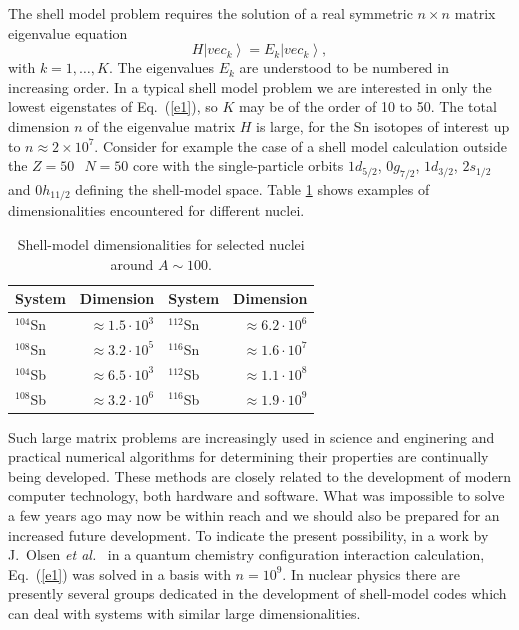 \documentclass{article}
\newcommand{\be}{\begin{equation}}
\newcommand{\ee}{\end{equation}}
\newcommand{\ket}[1]{\left| #1 \right\rangle}
\begin{document}
The shell model problem requires the solution of a real symmetric
$n \times n$ matrix eigenvalue equation
\be
H\ket{vec_k} = E_k \ket{vec_k},
\label{e1}
\ee
with $k = 1,\ldots, K$. The eigenvalues $E_k$ are understood to be
numbered in increasing order. In a typical shell model problem
we are interested in only the lowest eigenstates of Eq.~(\ref{e1}),
so $K$ may be of the order of 10 to 50.
The total dimension $n$ of the eigenvalue matrix $H$ is large,
for the Sn isotopes of interest up to $n \approx 2 \times 10^{7}$.
Consider for example the case of a shell model calculation
outside the $Z = 50\;\,\; N = 50$ core with the single-particle orbits
$1d_{5/2}$, $0g_{7/2}$, $1d_{3/2}$, $2s_{1/2}$ and $0h_{11/2}$ defining the shell-model
space. Table \ref{tab:dims} shows examples of dimensionalities encountered for 
different nuclei.
\begin{table}
\caption{Shell-model dimensionalities for selected nuclei around $A\sim 100$.\label{tab:dims}}
\begin{center}
\begin{tabular}{|lrlr|} \hline
System & Dimension & System & Dimension\\ \hline
$^{104}$Sn  & $\approx 1.5 \cdot 10^3$&  $^{112}$Sn  & $\approx 6.2 \cdot 10^6$\\
$^{108}$Sn  & $\approx 3.2 \cdot 10^5$&  $^{116}$Sn  & $\approx 1.6 \cdot 10^7$\\ 
$^{104}$Sb  & $\approx 6.5 \cdot 10^3$ &  $^{112}$Sb  & $\approx 1.1 \cdot10^8$ \\
$^{108}$Sb  & $\approx 3.2 \cdot 10^6$ &  $^{116}$Sb  & $\approx 1.9 \cdot 10^9$ \\ \hline
\end{tabular}
\end{center}
\end{table}
Such large matrix problems are increasingly used in science and
enginering and practical numerical algorithms for determining their
properties are continually being developed.
These methods are closely related to the development of modern
computer technology, both  hardware and software.
What was impossible to solve a few years ago may now be within
reach and we should also be prepared for an increased  future
development. To indicate the present possibility,
in a work by J.~Olsen {\sl et al.}~\cite{ols90} in a quantum
chemistry configuration interaction calculation, Eq.~(\ref{e1})
was solved in a basis with $n = 10^{9}$. In nuclear physics there are presently
several groups dedicated in the development of 
shell-model codes which can deal with systems with similar large dimensionalities.
\end{document}
